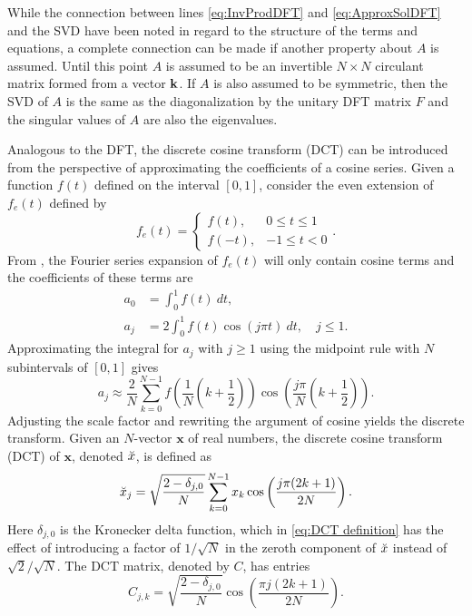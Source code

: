While the connection between lines \eqref{eq:InvProdDFT} and \eqref{eq:ApproxSolDFT} and the SVD have been noted in regard to the structure of the terms and equations, a complete connection can be made if another property about $A$ is assumed. Until this point $A$ is assumed to be an invertible $N \times N$ circulant matrix formed from a vector $\mathbf{k}$. If $A$ is also assumed to be symmetric, then the SVD of $A$ is the same as the diagonalization by the unitary DFT matrix $F$ and the singular values of $A$ are also the eigenvalues. \par 
Analogous to the DFT, the discrete cosine transform (DCT) can be introduced from the perspective of approximating the coefficients of a cosine series. Given a function $f(t)$ defined on the interval $[0,1]$, consider the even extension of $f_e(t)$ defined by
\[f_e(t) = \begin{cases}
f(t), & 0 \leq t \leq 1 \\
f(-t), & -1 \leq t < 0
\end{cases}.\]
From \cite[p.~49]{BoggessNarcowich2009}, the Fourier series expansion of $f_e(t)$ will only contain cosine terms and the coefficients of these terms are
\begin{align*}
a_0 &= \int_0^1 f(t)~dt, \\
a_j &= 2\int_0^1 f(t) \cos(j\pi{t})~dt, \quad j \leq 1.
\end{align*}
Approximating the integral for $a_j$ with $j \geq 1$ using the midpoint rule with $N$ subintervals of $[0,1]$ gives
\[a_j \approx \frac{2}{N}\sum_{k=0}^{N-1} f\left(\frac{1}{N}\left(k+\frac{1}{2}\right)\right)\cos\left(\frac{j\pi}{N}\left(k+\frac{1}{2}\right)\right).\]
Adjusting the scale factor and rewriting the argument of cosine yields the discrete transform. Given an $N$-vector $\mathbf{x}$ of real numbers, the discrete cosine transform (DCT) of $\mathbf{x}$, denoted $\breve{x}$, is defined as
\begin{equation}
\label{eq:DCT definition}
\breve{x}_j = \sqrt{\frac{2 - \delta_{j,0}}{N}} \sum_{k=0}^{N-1} x_k\cos\left(\frac{j\pi(2k + 1)}{2N}\right).
\end{equation}
Here $\delta_{j,0}$ is the Kronecker delta function, which in \eqref{eq:DCT definition} has the effect of introducing a factor of $1/\sqrt{N}$ in the zeroth component of $\breve{x}$ instead of $\sqrt{2}/\sqrt{N}$. The DCT matrix, denoted by $C$, has entries
\begin{equation}
\label{eq:DCT matrix}
C_{j,k} = \sqrt{\frac{2 - \delta_{j,0}}{N}} \cos\left(\frac{\pi{j}(2k + 1)}{2N}\right).
\end{equation}
